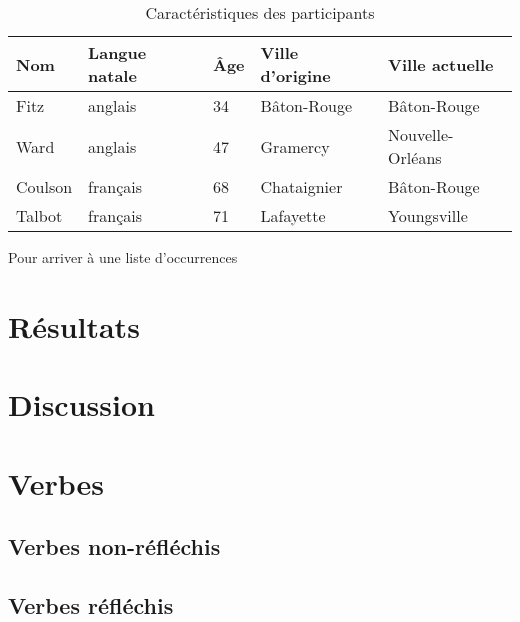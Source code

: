 \documentclass{article}
\begin{document}
    \begin{table}[tbhp]
      \caption{Caractéristiques des participants}
      \label{tab:caracteristiques}
      \centering
      \begin{tabular}{l l l l l}
        Nom     & Langue natale & Âge & Ville d'origine & Ville actuelle \\
        \hline
        Fitz    & anglais       & 34  & Bâton-Rouge     & Bâton-Rouge \\
        Ward    & anglais       & 47  & Gramercy        & Nouvelle-Orléans \\
        Coulson & français      & 68  & Chataignier     & Bâton-Rouge \\
        Talbot  & français      & 71  & Lafayette       & Youngsville
      \end{tabular}
    \end{table}

    Pour arriver à une liste d'occurrences 
  \section{Résultats}
    \label{sec:résultats}
  \section{Discussion}
    \label{sec:discussion}
  \printbibliography
  \appendix
    \section{Verbes}
      \label{app:verbes}
      \subsection{Verbes non-réfléchis}
        \noindent
      \subsection{Verbes réfléchis}
        \noindent
\end{document}
